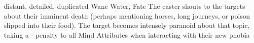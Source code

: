   {distant, detailed, duplicated}%
  {Wane}%
  {Water, Fate}%
  {}%
  {The caster shouts to the targets about their imminent death (perhaps mentioning horses, long journeys, or poison slipped into their food).
    The target becomes intensely paranoid about that topic, taking a - penalty to all Mind Attributes when interacting with their new phobia}%
  {}
